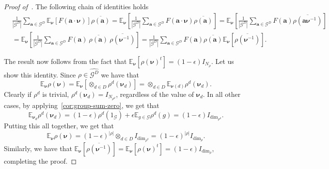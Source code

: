 \documentclass[a4paper,11pt]{article}
\theoremstyle{definition}
\newcommand{\ex}[1]{\mathbb{E}_{#1}}
\newcommand{\gr}{\mathscr{G}}
\newcommand{\ba}{\mathbf{a}}
\newcommand{\groupid}{1}
\newcommand{\tsp}[1]{{#1}^{t}}
\begin{document}
\begin{proof}[Proof of~]
The following chain of identities holds
\begin{align*}
& \frac{1}{|\gr^D|}   \sum_{\ba\in \gr^D} \ex{\bm{\nu}}\left[
F(\ba\cdot\bm{\nu})\right]\overline{\rho(\ba)}
  =  \ex{\bm{\nu}}\left[ \frac{1}{|\gr^D|}  \sum_{\ba\in \gr^D}
F(\ba\cdot\bm{\nu}) \overline{\rho(\ba)} \right] 
=  \ex{\bm{\nu}}\left[ \frac{1}{|\gr^D|}  \sum_{\ba\in \gr^D}
F(\ba) \overline{\rho(\ba \bm{\nu}^{-1})} \right] \\
& = \ex{\bm{\nu}}\left[ \frac{1}{|\gr^D|}  \sum_{\ba\in \gr^D}
F(\ba) \ \overline{\rho(\ba)} 
\ \overline{\rho(\bm{\nu}^{-1})}
\right] 
= \frac{1}{|\gr^D|} \sum_{\ba\in \gr^D} F(\ba)
\overline{\rho(\ba)} \ex{\bm{\nu}}[\overline{\rho(\bm{\nu}^{-1})}] .
\end{align*}

The result now follows from the fact that $\ex{\bm{\nu}}[\tsp{\rho(\bm{\nu})}]=(1-\epsilon)I_{N_{\rho}}$. Let us show this identity. 
  Since $\rho \in \widehat{\gr^D}$ we have that \[\ex{\bm{\nu}} \rho(\bm{\nu}) =
  \ex{\bm{\nu}} \left[ \otimes_{d\in D}\rho^d(\bm{\nu}_d) \right] =
  \otimes_{d\in D} \ex{\bm{\nu}(d)} \rho^d(\bm{\nu}_d).\]
Clearly if $\rho^d$ is trivial, $\rho^d(\bm{\nu}_d)=I_{N_{\rho^d}}$, regardless
  of the value of $\bm{\nu}_d$. In all other cases, by
  applying~\cref{cor:group-sum-zero}, we get that \[\ex{\bm{\nu}_d}
  \rho^d(\bm{\nu}_d)=(1-\epsilon)\rho^d(\groupid_{\gr}) + \epsilon \ex{g \in
  \gr}\rho^d(g) = (1-\epsilon)I_{\dim_{\rho^d}}.\]
  Putting this all together, we get that \[\ex{\bm{\nu}} \rho(\bm{\nu}) =
  (1-\epsilon)^{|\rho|}\otimes_{d\in D} I_{\dim_{\rho^d}} =
  (1-\epsilon)^{|\rho|}I_{\dim_{\rho}}.\]
Similarly, we have that $\ex{\bm{\nu}}[\overline{\rho(\bm{\nu}^{-1})}]=
\ex{\bm{\nu}}[\tsp{\rho(\bm{\nu})}]=(1-\epsilon)I_{\dim_{\rho}}$, completing the proof.
\end{proof}



\end{document}
